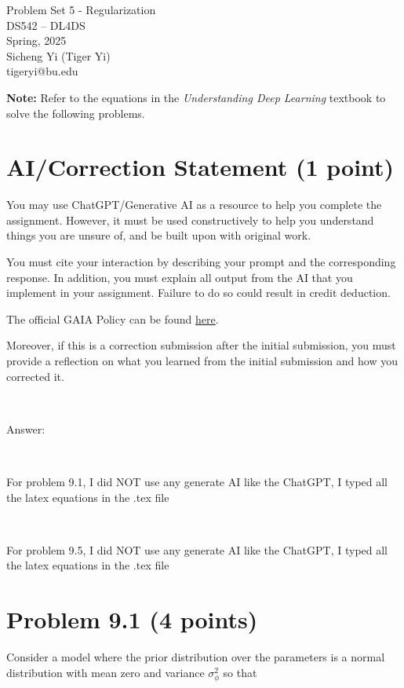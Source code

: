 \documentclass[10pt]{article}
\begin{document}
\begin{center}
    \LARGE {Problem Set 5 - Regularization} \\[1em]
    \Large{DS542 – DL4DS} \\[0.5em]
    \large Spring, 2025 \\
    \large Sicheng Yi (Tiger Yi) \\
    \large tigeryi@bu.edu
\end{center}

\vspace{2em}

\noindent\textbf{Note:} Refer to the equations in the \textit{Understanding Deep Learning} 
textbook to solve the following problems.

\section*{AI/Correction Statement (1 point)}

You may use ChatGPT/Generative AI as a resource to help you complete the assignment. 
However, it must be used constructively to help you understand things you are 
unsure of, and be built upon with original work.

You must cite your interaction by describing your prompt and the corresponding response. 
In addition, you must  explain all output from the AI that you implement in your 
assignment. Failure to do so could result in credit deduction. 

The official GAIA Policy can be found 
\href{https://www.bu.edu/cds-faculty/culture-community/gaia-policy/}{here}.

Moreover, if this is a correction submission after the initial submission, 
you must provide a reflection on what you learned from the initial submission 
and how you corrected it.

\

\noindent Answer:

\

\noindent  For problem 9.1, I did NOT use any generate AI like the ChatGPT, I typed all the latex equations in the .tex file

\ 

\noindent  For problem 9.5, I did NOT use any generate AI like the ChatGPT, I typed all the latex equations in the .tex file

\newpage



\section*{Problem 9.1 (4 points)}
Consider a model where the prior distribution over the parameters is a normal distribution with mean zero and variance
$\sigma^2_{\phi}$ so that
\end{document}
